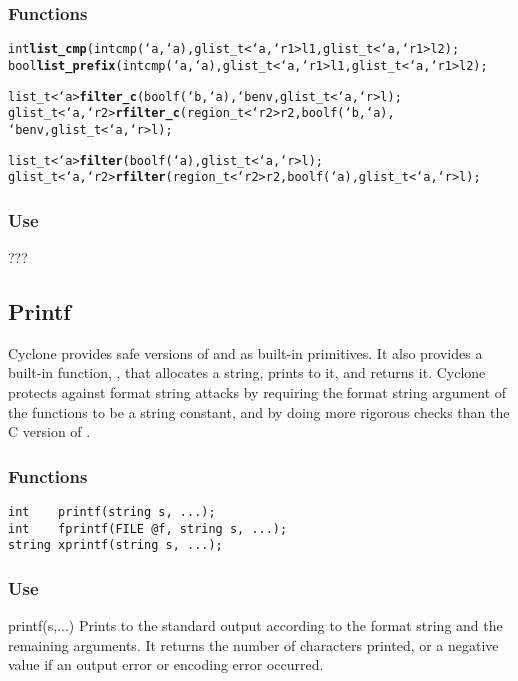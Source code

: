 \subsubsection*{Functions}
\begin{alltt}
int  \textbf{list_cmp}(int cmp(`a,`a), glist_t<`a,`r1> l1, glist_t<`a,`r1> l2);
bool \textbf{list_prefix}(int cmp(`a,`a), glist_t<`a,`r1> l1, glist_t<`a,`r1> l2);

list_t<`a>      \textbf{filter_c}(bool f(`b,`a), `b env, glist_t<`a,`r> l);
glist_t<`a,`r2> \textbf{rfilter_c}(region_t<`r2> r2, bool f(`b,`a), 
                          `b env, glist_t<`a,`r> l);
  
list_t<`a>      \textbf{filter}(bool f(`a), glist_t<`a,`r> l);
glist_t<`a,`r2> \textbf{rfilter}(region_t<`r2> r2,bool f(`a),glist_t<`a,`r> l);
\end{alltt}

\subsubsection*{Use}

???

\subsection{Printf}

Cyclone provides safe versions of  and  as
built-in primitives.  It also provides a built-in function,
, that allocates a string, prints to it, and returns it.
Cyclone protects against format string attacks by requiring the format
string argument of the  functions to be a string constant,
and by doing more rigorous checks than the C version of .

\subsubsection*{Functions}
\begin{verbatim}
int    printf(string s, ...);
int    fprintf(FILE @f, string s, ...);
string xprintf(string s, ...);
\end{verbatim}

\subsubsection*{Use}

\begin{defun}{printf}{(s,...)}
Prints to the standard output according to the format string  and
the remaining arguments.  It returns the number of characters printed,
or a negative value if an output error or encoding error occurred.
\end{defun}

